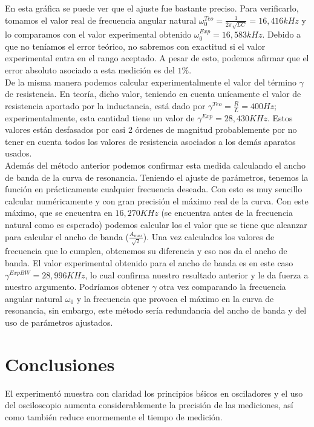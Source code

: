 \documentclass[%
 reprint,
 amsmath,amssymb,
 aps,
]{revtex4-1}
\begin{document}
{En esta gráfica se puede ver que el ajuste fue bastante preciso. Para verificarlo, tomamos el valor real de frecuencia angular natural $\omega_0^{Teo} = \frac{1}{2\pi \sqrt{LC}} = 16,416kHz$ y lo comparamos con el valor experimental obtenido  $\omega_0^{Exp} = 16,583kHz$. Debido a que no teníamos el error teórico, no sabremos con exactitud si el valor experimental entra en el rango aceptado. A pesar de esto, podemos afirmar que el error absoluto asociado a esta medición es del $1\%$.\\

De la misma manera podemos calcular experimentalmente el valor del t\'ermino $\gamma$ de resistencia. En teoría, dicho valor, teniendo en cuenta un\'icamente el valor de resistencia aportado por la inductancia, est\'a dado por $\gamma^{Teo} = \frac{R}{L} = 400Hz$; experimentalmente, esta cantidad tiene un valor de $\gamma^{Exp} = 28,430KHz$. Estos valores están desfasados por casi 2 \'ordenes de magnitud probablemente por no tener en cuenta todos los valores de resistencia asociados a los dem\'as aparatos usados.\\

Adem\'as del m\'etodo anterior podemos confirmar esta medida calculando el ancho de banda de la curva de resonancia. Teniendo el ajuste de par\'ametros, tenemos la funci\'on en pr\'acticamente cualquier frecuencia deseada. Con esto es muy sencillo calcular num\'ericamente y con gran precisi\'on el m\'aximo real de la curva. Con este m\'aximo, que se encuentra en $16,270KHz$ (se encuentra antes de la frecuencia natural como es esperado) podemos calcular los el valor que se tiene que alcanzar para calcular el ancho de banda ($\frac{A_{max}}{\sqrt{2}}$). Una vez calculados los valores de frecuencia que lo cumplen, obtenemos su diferencia y eso nos da el ancho de banda. El valor experimental obtenido para el ancho de banda es en este caso $\gamma^{ExpBW} = 28,996KHz$, lo cual confirma nuestro resultado anterior y le da fuerza a nuestro argumento. Podr\'iamos obtener $\gamma$ otra vez comparando la frecuencia angular natural $\omega_0$ y la frecuencia que provoca el m\'aximo en la curva de resonancia, sin embargo, este m\'etodo ser\'ia redundancia del ancho de banda y del uso de par\'ametros ajustados.\\
 


 


\section{\label{sec:level1}Conclusiones}
El experiment\'o muestra con claridad los principios b\'sicos en osciladores y el uso del osciloscopio aumenta considerablemente la precisi\'on de las mediciones, as\'i como tambi\'en reduce enormemente el tiempo de medici\'on. 

}
\end{document}
